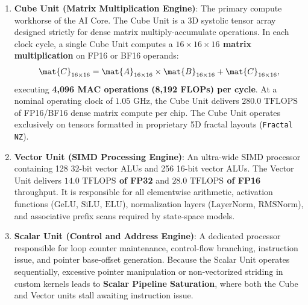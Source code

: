 \begin{enumerate}
    \item \textbf{Cube Unit (Matrix Multiplication Engine)}: The primary compute workhorse of the AI Core. The Cube Unit is a 3D systolic tensor array designed strictly for dense matrix multiply-accumulate operations. In each clock cycle, a single Cube Unit computes a \textbf{$16 \times 16 \times 16$ matrix multiplication} on FP16 or BF16 operands:
    \begin{equation}
        \mat{C}_{16 \times 16} = \mat{A}_{16 \times 16} \times \mat{B}_{16 \times 16} + \mat{C}_{16 \times 16},
    \end{equation}
    executing \textbf{4,096 MAC operations (8,192 FLOPs) per cycle}. At a nominal operating clock of $1.05\text{ GHz}$, the Cube Unit delivers \textbf{$280.0\text{ TFLOPS}$} of FP16/BF16 dense matrix compute per chip. The Cube Unit operates exclusively on tensors formatted in proprietary 5D fractal layouts (\texttt{Fractal NZ}).
    \item \textbf{Vector Unit (SIMD Processing Engine)}: An ultra-wide SIMD processor containing 128 32-bit vector ALUs and 256 16-bit vector ALUs. The Vector Unit delivers \textbf{$14.0\text{ TFLOPS}$ of FP32} and \textbf{$28.0\text{ TFLOPS}$ of FP16} throughput. It is responsible for all elementwise arithmetic, activation functions ($\text{GeLU}$, $\text{SiLU}$, $\text{ELU}$), normalization layers ($\text{LayerNorm}$, $\text{RMSNorm}$), and associative prefix scans required by state-space models.
    \item \textbf{Scalar Unit (Control and Address Engine)}: A dedicated processor responsible for loop counter maintenance, control-flow branching, instruction issue, and pointer base-offset generation. Because the Scalar Unit operates sequentially, excessive pointer manipulation or non-vectorized striding in custom kernels leads to \textbf{Scalar Pipeline Saturation}, where both the Cube and Vector units stall awaiting instruction issue.
\end{enumerate}

